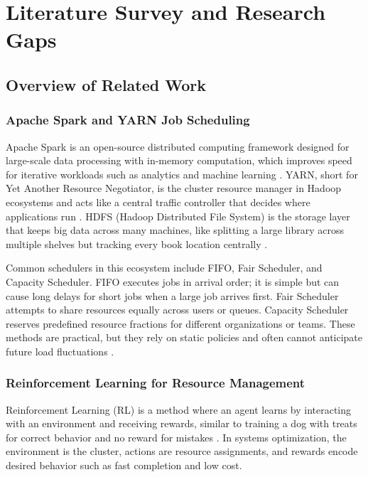 \chapter{Literature Survey and Research Gaps}
\label{chap:literature}

\section{Overview of Related Work}
\subsection{Apache Spark and YARN Job Scheduling}
Apache Spark is an open-source distributed computing framework designed for large-scale data processing with in-memory computation, which improves speed for iterative workloads such as analytics and machine learning \cite{zaharia2016spark}. YARN, short for Yet Another Resource Negotiator, is the cluster resource manager in Hadoop ecosystems and acts like a central traffic controller that decides where applications run \cite{vavilapalli2013apache}. HDFS (Hadoop Distributed File System) is the storage layer that keeps big data across many machines, like splitting a large library across multiple shelves but tracking every book location centrally \cite{white2012hadoop}.

Common schedulers in this ecosystem include FIFO, Fair Scheduler, and Capacity Scheduler. FIFO executes jobs in arrival order; it is simple but can cause long delays for short jobs when a large job arrives first. Fair Scheduler attempts to share resources equally across users or queues. Capacity Scheduler reserves predefined resource fractions for different organizations or teams. These methods are practical, but they rely on static policies and often cannot anticipate future load fluctuations \cite{schedsurvey2016}.

\subsection{Reinforcement Learning for Resource Management}
Reinforcement Learning (RL) is a method where an agent learns by interacting with an environment and receiving rewards, similar to training a dog with treats for correct behavior and no reward for mistakes \cite{sutton2018rl}. In systems optimization, the environment is the cluster, actions are resource assignments, and rewards encode desired behavior such as fast completion and low cost.

